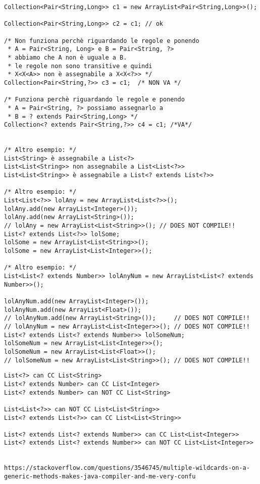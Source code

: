\begin{lstlisting}
Collection<Pair<String,Long>> c1 = new ArrayList<Pair<String,Long>>();

Collection<Pair<String,Long>> c2 = c1; // ok

/* Non funziona perchè riguardando le regole e ponendo
 * A = Pair<String, Long> e B = Pair<String, ?>
 * abbiamo che A non è uguale a B.
 * le regole non sono transitive e quindi 
 * X<X<A>> non è assegnabile a X<X<?>> */
Collection<Pair<String,?>> c3 = c1;  /* NON VA */

/* Funziona perchè riguardando le regole e ponendo
 * A = Pair<String, ?> possiamo assegnarlo a
 * B = ? extends Pair<String,Long> */
Collection<? extends Pair<String,?>> c4 = c1; /*VA*/


/* Altro esempio: */
List<String> è assegnabile a List<?>
List<List<String>> non assegnabile a List<List<?>>
List<List<String>> è assegnabile a List<? extends List<?>>

/* Altro esempio: */
List<List<?>> lolAny = new ArrayList<List<?>>();
lolAny.add(new ArrayList<Integer>());
lolAny.add(new ArrayList<String>());
// lolAny = new ArrayList<List<String>>(); // DOES NOT COMPILE!!
List<? extends List<?>> lolSome;
lolSome = new ArrayList<List<String>>();
lolSome = new ArrayList<List<Integer>>();

/* Altro esempio: */
List<List<? extends Number>> lolAnyNum = new ArrayList<List<? extends Number>>();

lolAnyNum.add(new ArrayList<Integer>());
lolAnyNum.add(new ArrayList<Float>());
// lolAnyNum.add(new ArrayList<String>());     // DOES NOT COMPILE!!
// lolAnyNum = new ArrayList<List<Integer>>(); // DOES NOT COMPILE!!
List<? extends List<? extends Number>> lolSomeNum;
lolSomeNum = new ArrayList<List<Integer>>();
lolSomeNum = new ArrayList<List<Float>>();
// lolSomeNum = new ArrayList<List<String>>(); // DOES NOT COMPILE!!
\end{lstlisting}


\begin{lstlisting}
List<?> can CC List<String>
List<? extends Number> can CC List<Integer>
List<? extends Number> can NOT CC List<String>

List<List<?>> can NOT CC List<List<String>>
List<? extends List<?>> can CC List<List<String>>

List<? extends List<? extends Number>> can CC List<List<Integer>>
List<? extends List<? extends Number>> can NOT CC List<List<Integer>>


https://stackoverflow.com/questions/3546745/multiple-wildcards-on-a-generic-methods-makes-java-compiler-and-me-very-confu
\end{lstlisting}
